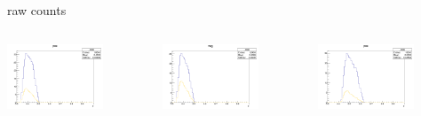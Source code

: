 \begin{frame}{raw counts}
\begin{columns}
\begin{column}[T]{0.25\textwidth}
\includegraphics[width = 0.7\textwidth]{results/yield/statistics/yield_x_Q2_z_0.35_4.000_0.40_pos.png}
\end{column}
\begin{column}[T]{0.25\textwidth}
\includegraphics[width = 0.7\textwidth]{results/yield/statistics/yield_x_Q2_z_0.35_4.000_0.40_neg.png}
\end{column}
\begin{column}[T]{0.25\textwidth}
\includegraphics[width = 0.7\textwidth]{results/yield/statistics/yield_x_Q2_z_0.35_4.000_0.50_pos.png}

\end{column}
\end{columns}
\end{frame}
